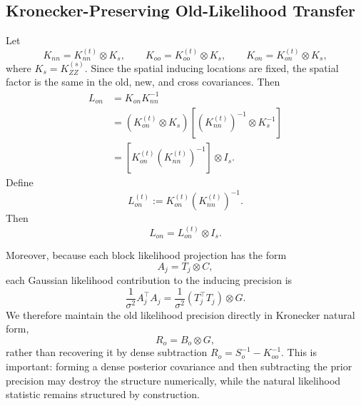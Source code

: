 \documentclass[12pt]{article}
\begin{document}
\subsection{Kronecker-Preserving Old-Likelihood Transfer}
\label{subsec:kronecker_preserving_transfer}

Let
\begin{equation}
    K_{nn}
    =
    K_{nn}^{(t)}\otimes K_s,
    \qquad
    K_{oo}
    =
    K_{oo}^{(t)}\otimes K_s,
    \qquad
    K_{on}
    =
    K_{on}^{(t)}\otimes K_s,
    \label{eq:old_new_kronecker_covariances}
\end{equation}
where \(K_s=K_{ZZ}^{(s)}\). Since the spatial inducing locations are fixed, the spatial
factor is the same in the old, new, and cross covariances. Then
\begin{align}
    L_{on}
    &=
    K_{on}K_{nn}^{-1} \\
    &=
    \left(
        K_{on}^{(t)}\otimes K_s
    \right)
    \left[
        \left(K_{nn}^{(t)}\right)^{-1}
        \otimes
        K_s^{-1}
    \right] \\
    &=
    \left[
        K_{on}^{(t)}
        \left(K_{nn}^{(t)}\right)^{-1}
    \right]
    \otimes I_s .
\end{align}
Define
\begin{equation}
    L_{on}^{(t)}
    :=
    K_{on}^{(t)}
    \left(K_{nn}^{(t)}\right)^{-1}.
\end{equation}
Then
\begin{equation}
    L_{on}=L_{on}^{(t)}\otimes I_s.
    \label{eq:temporal_only_transfer_operator}
\end{equation}

Moreover, because each block likelihood projection has the form
\begin{equation}
    A_j=T_j\otimes C,
\end{equation}
each Gaussian likelihood contribution to the inducing precision is
\begin{equation}
    \frac{1}{\sigma^2}A_j^\top A_j
    =
    \frac{1}{\sigma^2}
    (T_j^\top T_j)
    \otimes
    G.
\end{equation}
We therefore maintain the old likelihood precision directly in Kronecker natural form,
\begin{equation}
    R_o=B_o\otimes G,
    \label{eq:old_likelihood_precision_kronecker}
\end{equation}
rather than recovering it by dense subtraction \(R_o=S_o^{-1}-K_{oo}^{-1}\). This is
important: forming a dense posterior covariance and then subtracting the prior precision
may destroy the structure numerically, while the natural likelihood statistic remains
structured by construction.
\end{document}
